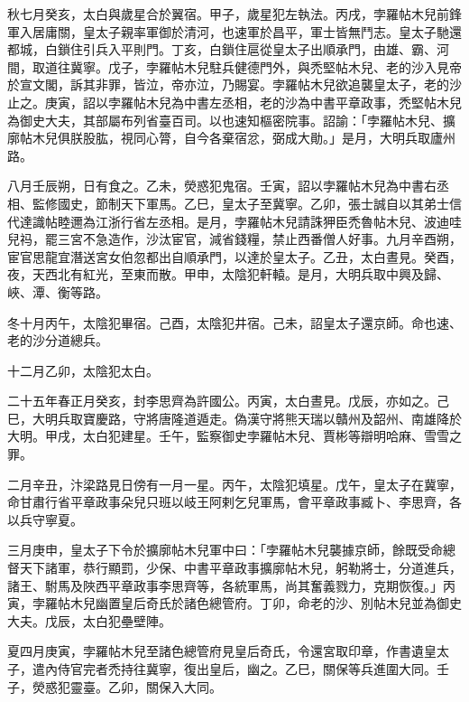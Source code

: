 \begin{pinyinscope}
 秋七月癸亥，太白與歲星合於翼宿。甲子，歲星犯左執法。丙戌，孛羅帖木兒前鋒軍入居庸關，皇太子親率軍御於清河，也速軍於昌平，軍士皆無鬥志。皇太子馳還都城，白鎖住引兵入平則門。丁亥，白鎖住扈從皇太子出順承門，由雄、霸、河間，取道往冀寧。戊子，孛羅帖木兒駐兵健德門外，與禿堅帖木兒、老的沙入見帝於宣文閣，訴其非罪，皆泣，帝亦泣，乃賜宴。孛羅帖木兒欲追襲皇太子，老的沙止之。庚寅，詔以孛羅帖木兒為中書左丞相，老的沙為中書平章政事，禿堅帖木兒為御史大夫，其部屬布列省臺百司。以也速知樞密院事。詔諭：「孛羅帖木兒、擴廓帖木兒俱朕股肱，視同心膂，自今各棄宿忿，弼成大勛。」是月，大明兵取廬州路。



 八月壬辰朔，日有食之。乙未，熒惑犯鬼宿。壬寅，詔以孛羅帖木兒為中書右丞相、監修國史，節制天下軍馬。乙巳，皇太子至冀寧。乙卯，張士誠自以其弟士信代達識帖睦邇為江浙行省左丞相。是月，孛羅帖木兒請誅狎臣禿魯帖木兒、波迪哇兒祃，罷三宮不急造作，沙汰宦官，減省錢糧，禁止西番僧人好事。九月辛酉朔，宦官思龍宜潛送宮女伯忽都出自順承門，以達於皇太子。乙丑，太白晝見。癸酉，夜，天西北有紅光，至東而散。甲申，太陰犯軒轅。是月，大明兵取中興及歸、峽、潭、衡等路。



 冬十月丙午，太陰犯畢宿。己酉，太陰犯井宿。己未，詔皇太子還京師。命也速、老的沙分道總兵。



 十二月乙卯，太陰犯太白。



 二十五年春正月癸亥，封李思齊為許國公。丙寅，太白晝見。戊辰，亦如之。己巳，大明兵取寶慶路，守將唐隆道遁走。偽漢守將熊天瑞以贛州及韶州、南雄降於大明。甲戌，太白犯建星。壬午，監察御史孛羅帖木兒、賈彬等辯明哈麻、雪雪之罪。



 二月辛丑，汴梁路見日傍有一月一星。丙午，太陰犯填星。戊午，皇太子在冀寧，命甘肅行省平章政事朵兒只班以岐王阿剌乞兒軍馬，會平章政事臧卜、李思齊，各以兵守寧夏。



 三月庚申，皇太子下令於擴廓帖木兒軍中曰：「孛羅帖木兒襲據京師，餘既受命總督天下諸軍，恭行顯罰，少保、中書平章政事擴廓帖木兒，躬勒將士，分道進兵，諸王、駙馬及陜西平章政事李思齊等，各統軍馬，尚其奮義戮力，克期恢復。」丙寅，孛羅帖木兒幽置皇后奇氏於諸色總管府。丁卯，命老的沙、別帖木兒並為御史大夫。戊辰，太白犯壘壁陣。



 夏四月庚寅，孛羅帖木兒至諸色總管府見皇后奇氏，令還宮取印章，作書遺皇太子，遣內侍官完者禿持往冀寧，復出皇后，幽之。乙巳，關保等兵進圍大同。壬子，熒惑犯靈臺。乙卯，關保入大同。




\end{pinyinscope}

